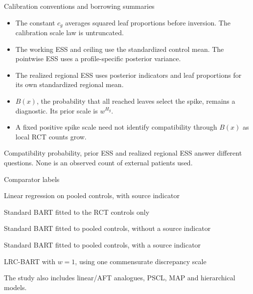 \documentclass[11pt,aspectratio=169]{beamer}
\newcommand{\key}[1]{{\color{AccentBlue}\textbf{#1}}}
\begin{document}
\begin{frame}{Calibration conventions and borrowing summaries}
  \small
  \begin{itemize}\setlength\itemsep{0.55em}
    \item The constant $c_g$ averages squared leaf proportions before inversion. The calibration scale law is untruncated.
    \item The working ESS and ceiling use the standardized control mean. The pointwise ESS uses a profile-specific posterior variance.
    \item The realized regional ESS uses posterior indicators and leaf proportions for its own standardized regional mean.
    \item $B(x)$, the probability that all reached leaves select the spike, remains a diagnostic. Its prior scale is $w^{H_g}$.
    \item A fixed positive spike scale need not identify compatibility through $B(x)$ as local RCT counts grow.
  \end{itemize}

  \vfill
  {\small Compatibility probability, prior ESS and realized regional ESS answer different questions. None is an observed count of external patients used.}
\end{frame}

\begin{frame}{Comparator labels}
  \normalsize
  \begin{description}\setlength\itemsep{0.55em}
    \item[\key{LM-PP}] Linear regression on pooled controls, with source indicator
    \item[\key{BART-NP}] Standard BART fitted to the RCT controls only
    \item[\key{BART-CP}] Standard BART fitted to pooled controls, without a source indicator
    \item[\key{BART-PP}] Standard BART fitted to pooled controls, with a source indicator
    \item[\key{C-BART}] LRC-BART with $w=1$, using one commensurate discrepancy scale
  \end{description}

  \vfill
  {\small The study also includes linear/AFT analogues, PSCL, MAP and hierarchical models.}
\end{frame}
\end{document}
